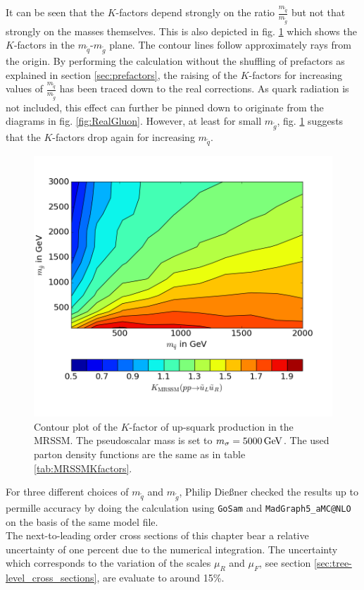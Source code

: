It can be seen that the $K$-factors depend strongly on the ratio $\frac{m_{\tilde{q}}}{m_{\tilde{g}}}$ but not that strongly on the masses themselves. This is also depicted in fig. \ref{fig:Kfactor_MRSSM} which shows the $K$-factors in the $m_{\tilde{q}}$-$m_{\tilde{g}}$ plane. The contour lines follow approximately rays from the origin. By performing the calculation without the shuffling of prefactors as explained in section \ref{sec:prefactors}, the raising of the $K$-factors for increasing values of $\frac{m_{\tilde{q}}}{m_{\tilde{g}}}$ has been traced down to the real corrections. As quark radiation is not included, this effect can further be pinned down to originate from the diagrams in fig. \ref{fig:RealGluon}. However, at least for small $m_{\tilde{g}}$, fig. \ref{fig:Kfactor_MRSSM} suggests that the $K$-factors drop again for increasing $m_{\tilde{q}}$.
\begin{figure}[H]
\begin{center}
\includegraphics[scale=.6]{figures/Kfactor_MRSSM.png}
\caption{Contour plot of the $K$-factor of up-squark production in the MRSSM. The pseudoscalar mass is set to $m_{\sigma} = \unit[5000]{GeV}$. The used parton density functions are the same as in table \ref{tab:MRSSMKfactors}.}\label{fig:Kfactor_MRSSM}
\end{center}
\end{figure}
For three different choices of $m_{\tilde{q}}$ and $m_{\tilde{g}}$, Philip Dießner checked the results up to permille accuracy by doing the calculation using \texttt{GoSam}\cite{Cullen:2014yla, Cullen:2011ac} and \texttt{MadGraph5\_aMC@NLO}\cite{Alwall:2014hca} on the basis of the same model file.\\
The next-to-leading order cross sections of this chapter bear a relative uncertainty of one percent due to the numerical integration. The uncertainty which corresponds to the variation of the scales $\mu_R$ and $\mu_F$, see section \ref{sec:tree-level_cross_sections}, are evaluate to around 15\%.


